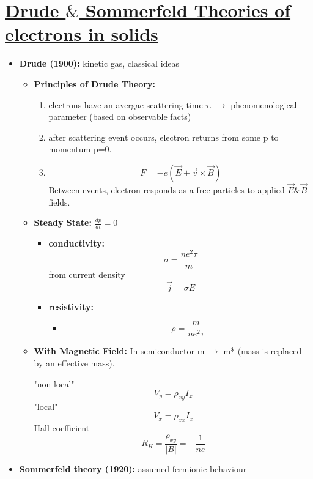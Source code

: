 \section[Drude $\&$ Sommerfeld Theories of electrons in solids]{\hyperlink{toc}{Drude $\&$ Sommerfeld Theories of electrons in solids}}


\begin{itemize}
    \item \textbf{Drude (1900):} kinetic gas, classical ideas
    \begin{itemize}
        \item \textbf{Principles of Drude Theory:}
        \begin{enumerate}
            \item electrons have an avergae scattering time $\tau$.
                $\rightarrow$ phenomenological parameter (based on observable facts)
            \item after scattering event occurs, electron returns from some p to momentum p=0.
            \item \[F=-e(\vec{E} + \vec{v}\times\vec{B})\]
            Between events, electron responds as a free particles to applied $\vec{E} \& \vec{B}$ fields.
        \end{enumerate}
        \item \textbf{Steady State:} $\frac{dp}{dt}=0$
        \begin{itemize}
            \item \textbf{conductivity:} \[ \sigma = \frac{ne^2\tau}{m} \]
            from current density
            \[\vec{j} = \sigma E \]
            \item \textbf{resistivity:}
            \begin{itemize}
                \item \[\rho = \frac{m}{ne^2\tau} \] 
            \end{itemize}
        \end{itemize}
        \item \textbf{With Magnetic Field:} In semiconductor m $\rightarrow$ m* (mass is replaced by an effective mass).
        
        "non-local" \[V_y = \rho_{xy} I_x \] 
        "local" \[V_x = \rho_{xx} I_x \] 
        Hall coefficient\[R_H = \frac{\rho_{xy}}{|B|} = - \frac{1}{ne} \]
        
    \end{itemize}
    \item \textbf{Sommerfeld theory (1920):} assumed fermionic behaviour
\end{itemize}
